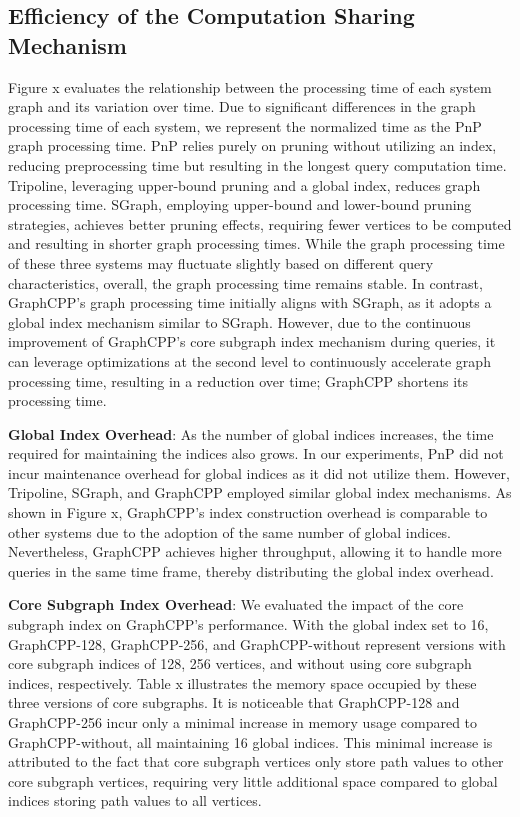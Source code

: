 \documentclass[lettersize,journal]{IEEEtran} %
\begin{document}
\subsection{Efficiency of the Computation Sharing Mechanism}
Figure x evaluates the relationship between the processing time of each system graph and its variation over time. Due to significant differences in the graph processing time of each system, we represent the normalized time as the PnP\cite{pnp} graph processing time. PnP relies purely on pruning without utilizing an index, reducing preprocessing time but resulting in the longest query computation time. Tripoline\cite{tripoline}, leveraging upper-bound pruning and a global index, reduces graph processing time. SGraph\cite{sgraph}, employing upper-bound and lower-bound pruning strategies, achieves better pruning effects, requiring fewer vertices to be computed and resulting in shorter graph processing times. While the graph processing time of these three systems may fluctuate slightly based on different query characteristics, overall, the graph processing time remains stable. In contrast, GraphCPP's graph processing time initially aligns with SGraph, as it adopts a global index mechanism similar to SGraph. However, due to the continuous improvement of GraphCPP's core subgraph index mechanism during queries, it can leverage optimizations at the second level to continuously accelerate graph processing time, resulting in a reduction over time; GraphCPP shortens its processing time.

{\bf{Global Index Overhead}}: As the number of global indices increases, the time required for maintaining the indices also grows. In our experiments, PnP did not incur maintenance overhead for global indices as it did not utilize them. However, Tripoline\cite{tripoline}, SGraph\cite{sgraph}, and GraphCPP employed similar global index mechanisms. As shown in Figure x, GraphCPP's index construction overhead is comparable to other systems due to the adoption of the same number of global indices. Nevertheless, GraphCPP achieves higher throughput, allowing it to handle more queries in the same time frame, thereby distributing the global index overhead.

{\bf{Core Subgraph Index Overhead}}: We evaluated the impact of the core subgraph index on GraphCPP's performance. With the global index set to 16, GraphCPP-128, GraphCPP-256, and GraphCPP-without represent versions with core subgraph indices of 128, 256 vertices, and without using core subgraph indices, respectively. Table x illustrates the memory space occupied by these three versions of core subgraphs. It is noticeable that GraphCPP-128 and GraphCPP-256 incur only a minimal increase in memory usage compared to GraphCPP-without, all maintaining 16 global indices. This minimal increase is attributed to the fact that core subgraph vertices only store path values to other core subgraph vertices, requiring very little additional space compared to global indices storing path values to all vertices.
\end{document}
